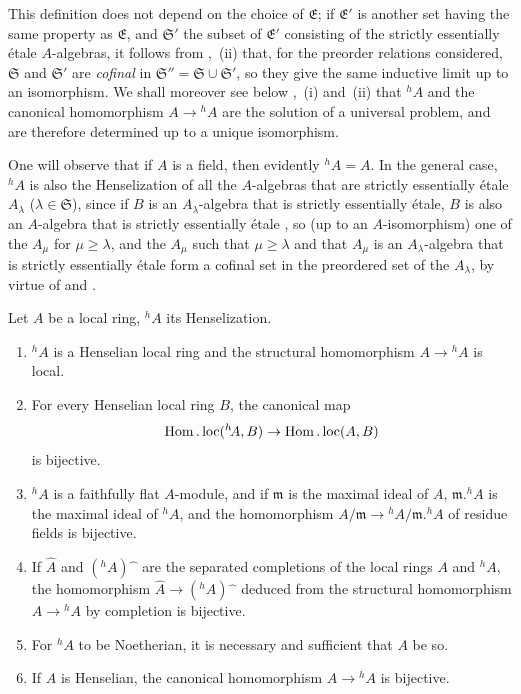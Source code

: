 This definition does not depend on the choice of $\mathfrak{E}$; if $\mathfrak{E}'$ is another set having the same property as $\mathfrak{E}$, and $\mathfrak{S}'$ the subset of $\mathfrak{E}'$ consisting of the strictly essentially \'{e}tale $A$-algebras, it follows from ,~(ii) that, for the preorder relations considered, $\mathfrak{S}$ and $\mathfrak{S}'$ are \emph{cofinal} in $\mathfrak{S}''=\mathfrak{S}\cup\mathfrak{S}'$, so they give the same inductive limit up to an isomorphism.
We shall moreover see below ,~(i) and~(ii) that ${}^h\!A$ and the canonical homomorphism $A\to{}^h\!A$ are the solution of a universal problem, and are therefore determined up to a unique isomorphism.

One will observe that if $A$ is a field, then evidently ${}^h\!A=A$.
In the general case, ${}^h\!A$ is also the Henselization of all the $A$-algebras that are strictly essentially \'{e}tale $A_\lambda$ ($\lambda\in\mathfrak{S}$), since if $B$ is an $A_\lambda$-algebra that is strictly essentially \'{e}tale, $B$ is also an $A$-algebra that is strictly essentially \'{e}tale , so (up to an $A$-isomorphism) one of the $A_\mu$ for $\mu\geq\lambda$, and the $A_\mu$ such that $\mu\geq\lambda$ and that $A_\mu$ is an $A_\lambda$-algebra that is strictly essentially \'{e}tale form a cofinal set in the preordered set of the $A_\lambda$, by virtue of  and .

\begin{theorem}[18.6.6]
\label{IV.18.6.6}
Let $A$ be a local ring, ${}^h\!A$ its Henselization.
\begin{enumerate}[label=\emph{\roman*)}]
  \item ${}^h\!A$ is a Henselian local ring and the structural homomorphism $A\to{}^h\!A$ is local.
  \item For every Henselian local ring $B$, the canonical map
  \[
    \operatorname{Hom}.\operatorname{loc}({}^h\!A,B)\to\operatorname{Hom}.\operatorname{loc}(A,B)
  \]
  is bijective.
  \item ${}^h\!A$ is a faithfully flat $A$-module, and if $\mathfrak{m}$ is the maximal ideal of $A$, $\mathfrak{m}.{}^h\!A$ is the maximal ideal of ${}^h\!A$, and the homomorphism $A/\mathfrak{m}\to{}^h\!A/\mathfrak{m}.{}^h\!A$ of residue fields is bijective.
  \item If $\hat{A}$ and $({}^h\!A)\hat{\phantom{x}}$ are the separated completions of the local rings $A$ and ${}^h\!A$, the homomorphism $\hat{A}\to({}^h\!A)\hat{\phantom{x}}$ deduced from the structural homomorphism $A\to{}^h\!A$ by completion is bijective.
  \item For ${}^h\!A$ to be Noetherian, it is necessary and sufficient that $A$ be so.
  \item If $A$ is Henselian, the canonical homomorphism $A\to{}^h\!A$ is bijective.
\end{enumerate}
\end{theorem}

